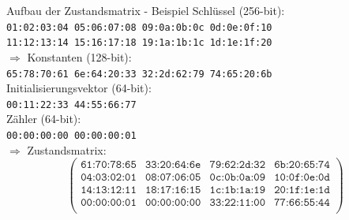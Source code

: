 \documentclass{beamer}
\begin{document}
\begin{frame}{Aufbau der Zustandsmatrix - Beispiel}
Schlüssel (256-bit): \\
\hspace{1em} \texttt{01:02:03:04 05:06:07:08 09:0a:0b:0c 0d:0e:0f:10} \\
\hspace{1em} \texttt{11:12:13:14 15:16:17:18 19:1a:1b:1c 1d:1e:1f:20} \\
$\Rightarrow$ Konstanten (128-bit): \\
\hspace{1em} \texttt{65:78:70:61 6e:64:20:33 32:2d:62:79 74:65:20:6b} \\
Initialisierungsvektor (64-bit): \\
\hspace{1em} \texttt{00:11:22:33 44:55:66:77} \\
Zähler (64-bit): \\
\hspace{1em} \texttt{00:00:00:00 00:00:00:01} \\
\vspace{1em} $\Rightarrow$ Zustandsmatrix:
\begin{equation*}
\begin{pmatrix}
\texttt{61:70:78:65}& \texttt{33:20:64:6e} & \texttt{79:62:2d:32} & \texttt{6b:20:65:74} \\
\texttt{04:03:02:01} & \texttt{08:07:06:05} & \texttt{0c:0b:0a:09} & \texttt{10:0f:0e:0d} \\
\texttt{14:13:12:11} & \texttt{18:17:16:15} & \texttt{1c:1b:1a:19} & \texttt{20:1f:1e:1d} \\
\texttt{00:00:00:01} & \texttt{00:00:00:00} & \texttt{33:22:11:00} & \texttt{77:66:55:44} \\
\end{pmatrix}
\end{equation*}
\end{frame}
\end{document}
